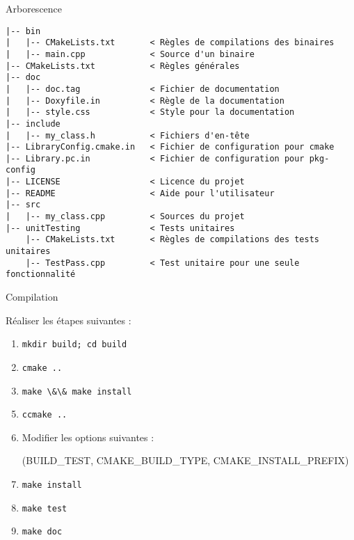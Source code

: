 \documentclass{beamer}
\begin{document}
\begin{frame}[fragile]{Arborescence}
  \begin{scriptsize}
\begin{verbatim}
|-- bin                        
|   |-- CMakeLists.txt       < Règles de compilations des binaires
|   |-- main.cpp             < Source d'un binaire
|-- CMakeLists.txt           < Règles générales
|-- doc                      
|   |-- doc.tag              < Fichier de documentation
|   |-- Doxyfile.in          < Règle de la documentation
|   |-- style.css            < Style pour la documentation
|-- include                  
|   |-- my_class.h           < Fichiers d'en-tête
|-- LibraryConfig.cmake.in   < Fichier de configuration pour cmake
|-- Library.pc.in            < Fichier de configuration pour pkg-config
|-- LICENSE                  < Licence du projet
|-- README                   < Aide pour l'utilisateur
|-- src
|   |-- my_class.cpp         < Sources du projet        
|-- unitTesting              < Tests unitaires
    |-- CMakeLists.txt       < Règles de compilations des tests unitaires
    |-- TestPass.cpp         < Test unitaire pour une seule fonctionnalité
\end{verbatim}
  \end{scriptsize}
\end{frame}

\begin{frame}{Compilation}
  \begin{exampleblock}{Réaliser les étapes suivantes :}
    \begin{enumerate}
    \item \verb?mkdir build; cd build?
    \item \verb?cmake ..?
    \item \verb?make \&\& make install? 
    \end{enumerate}
  \end{exampleblock}
  \pause
  \begin{exampleblock}{}
    \begin{enumerate}
      \setcounter{enumi}{4}
    \item \verb?ccmake ..?
    \item Modifier les options suivantes :\\ \begin{scriptsize}(BUILD\_TEST, CMAKE\_BUILD\_TYPE,  CMAKE\_INSTALL\_PREFIX)\end{scriptsize}
    \item \verb?make install?
    \item \verb?make test?
    \end{enumerate}
  \end{exampleblock}
  \pause
  \begin{exampleblock}{}
    \begin{enumerate}
      \setcounter{enumi}{8}
    \item \verb?make doc?
    \end{enumerate}
  \end{exampleblock}
\end{frame}
\end{document}
